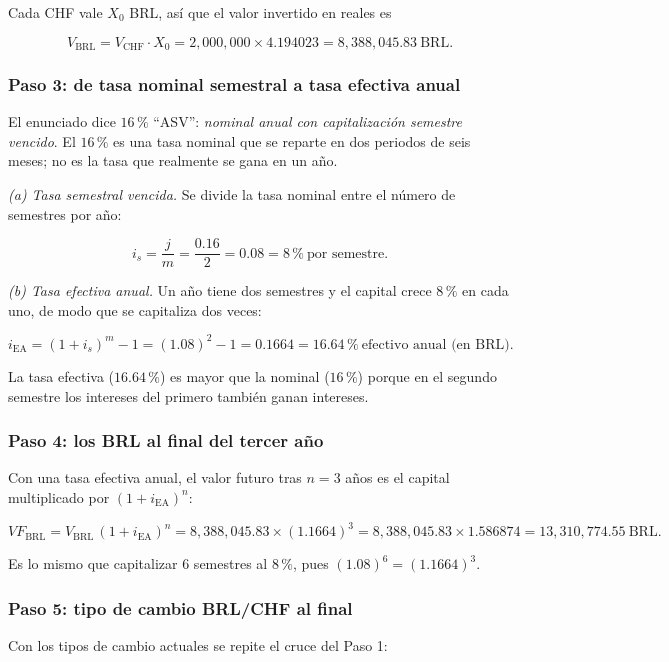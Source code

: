 \documentclass[11pt]{article}
\newcommand{\pc}{\text{\%}}
\begin{document}
Cada CHF vale $X_0$ BRL, as\'i que el valor invertido en reales es

\[
V_{\text{BRL}}=V_{\text{CHF}}\cdot X_0=2{,}000{,}000\times 4.194023=8{,}388{,}045.83\ \text{BRL.}
\]

\subsubsection*{Paso 3: de tasa nominal semestral a tasa efectiva anual}

El enunciado dice $16\,\pc$ ``ASV'': \emph{nominal anual con capitalizaci\'on semestre vencido}. El $16\,\pc$ es una tasa nominal que se reparte en dos periodos de seis meses; no es la tasa que realmente se gana en un a\~no.

\emph{(a) Tasa semestral vencida.} Se divide la tasa nominal entre el n\'umero de semestres por a\~no:

\[
i_{s}=\frac{j}{m}=\frac{0.16}{2}=0.08=8\,\pc\ \text{por semestre.}
\]

\emph{(b) Tasa efectiva anual.} Un a\~no tiene dos semestres y el capital crece $8\,\pc$ en cada uno, de modo que se capitaliza dos veces:

\[
i_{\text{EA}}=(1+i_s)^{m}-1=(1.08)^{2}-1=0.1664=16.64\,\pc\ \text{efectivo anual (en BRL).}
\]

La tasa efectiva ($16.64\,\pc$) es mayor que la nominal ($16\,\pc$) porque en el segundo semestre los intereses del primero tambi\'en ganan intereses.

\subsubsection*{Paso 4: los BRL al final del tercer a\~no}

Con una tasa efectiva anual, el valor futuro tras $n=3$ a\~nos es el capital multiplicado por $(1+i_{\text{EA}})^n$:

\[
VF_{\text{BRL}}=V_{\text{BRL}}\,(1+i_{\text{EA}})^{n}
=8{,}388{,}045.83\times(1.1664)^{3}
=8{,}388{,}045.83\times 1.586874
=13{,}310{,}774.55\ \text{BRL.}
\]

Es lo mismo que capitalizar $6$ semestres al $8\,\pc$, pues $(1.08)^6=(1.1664)^3$.

\subsubsection*{Paso 5: tipo de cambio BRL/CHF al final}

Con los tipos de cambio actuales se repite el cruce del Paso 1:
\end{document}
